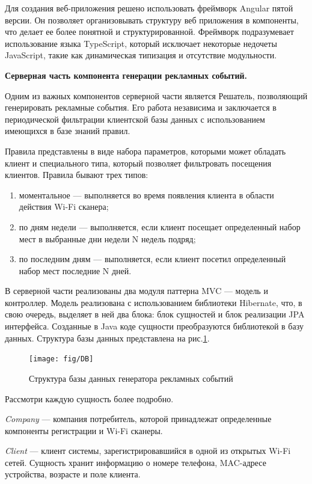 Для создания веб-приложения решено использовать фреймворк Angular пятой версии. Он позволяет организовывать структуру веб приложения в компоненты, что делает ее более понятной и структурированной. Фреймворк подразумевает использование языка TypeScript, который исключает некоторые недочеты JavaScript, такие как динамическая типизация и отсутствие модульности.

\textbf{Серверная часть компонента генерации рекламных событий.}

Одним из важных компонентов серверной части является Решатель, позволяющий генерировать рекламные события. Его работа независима и заключается в периодической фильтрации клиентской базы данных с использованием имеющихся в базе знаний правил. 

Правила представлены в виде набора параметров, которыми может обладать клиент и специального типа, который позволяет фильтровать посещения клиентов. Правила бывают трех типов:

\begin{enumerate}
	\item моментальное --- выполняется во время появления клиента в области действия Wi-Fi сканера;
	\item по дням недели --- выполняется, если клиент посещает определенный набор мест в выбранные дни недели N недель подряд;
	\item по последним дням --- выполняется, если клиент посетил определенный набор мест последние N дней.
\end{enumerate}

В серверной части реализованы два модуля паттерна MVC --- модель и контроллер. Модель реализована с использованием библиотеки Hibernate, что, в свою очередь, выделяет в ней два блока: блок сущностей и блок реализации JPA интерфейса. Созданные в Java коде сущности преобразуются библиотекой в базу данных. Структура базы данных представлена на рис.\ref{fig:DB}.

\begin{figure}[h]
	\centering
	\texttt{[image: fig/DB]}
	\caption{Структура базы данных генератора рекламных событий}
	\label{fig:DB}
\end{figure}

Рассмотри каждую сущность более подробно.

\textit{Company} --- компания потребитель, которой принадлежат определенные компоненты регистрации и Wi-Fi сканеры.  

\textit{Client} --- клиент системы, зарегистрировавшийся в одной из открытых Wi-Fi сетей. Сущность хранит информацию о номере телефона, MAC-адресе устройства, возрасте  и поле клиента.

